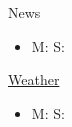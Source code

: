 \begin{frame}{News}
\begin{itemize}
\tiny \item \tiny M:  S: 
\end{itemize} 

\underline{Weather}
\begin{itemize}
\tiny \item \tiny M:  S: 
\end{itemize} 


\end{frame} 
